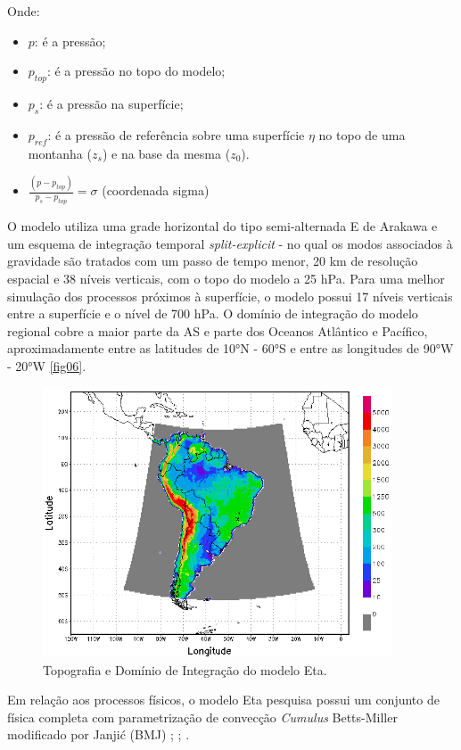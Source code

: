 Onde:

\begin{itemize}
\item $p$: é a pressão;
\item $p_{top}$: é a pressão no topo do modelo;
\item $p_{s}$: é a pressão na superfície;
\item $p_{ref}$: é a pressão de referência sobre uma superfície $\eta$ no topo de uma montanha ($z_{s}$) e na base da mesma ($z_{0}$).
\item $\frac{(p-p_{top})}{p_{s}-p_{top}}=\sigma$ (coordenada sigma)
\end{itemize}

O modelo utiliza uma grade horizontal do tipo semi-alternada E de Arakawa \cite{arakawalamb77} e um esquema de integração temporal \textit{split-explicit} - no qual os modos associados à gravidade são tratados com um passo de tempo menor, 20 km de resolução espacial e 38 níveis verticais, com o topo do modelo a 25 hPa. Para uma melhor simulação dos processos próximos à superfície, o modelo possui 17 níveis verticais entre a superfície e o nível de 700 hPa. O domínio de integração do modelo regional cobre a maior parte da AS e parte dos Oceanos Atlântico e Pacífico, aproximadamente entre as latitudes de 10°N - 60°S e entre as longitudes de 90°W - 20°W \autoref{fig06}.

\begin{figure}[!hpb]
\centering
\includegraphics[height=8cm]{./figs/topo_dom.png}
\caption{Topografia e Domínio de Integração do modelo Eta.}
\label{fig06}
\end{figure}

Em relação aos processos físicos, o modelo Eta pesquisa possui um conjunto de física completa com parametrização de convecção \textit{Cumulus} Betts-Miller modificado por Janjić (BMJ) \cite{betts86}; \cite{bettsmiller86}; \cite{janjic94}.

